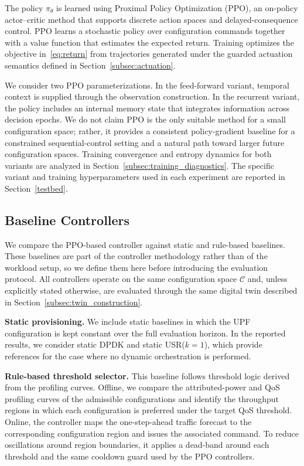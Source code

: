 \documentclass[a4paper,fleqn]{cas-sc}
\begin{document}
The policy $\pi_\theta$ is learned using Proximal Policy Optimization (PPO), an on-policy actor--critic method that supports discrete action spaces and delayed-consequence control. PPO learns a stochastic policy over configuration commands together with a value function that estimates the expected return. Training optimizes the objective in~\eqref{eq:return} from trajectories generated under the guarded actuation semantics defined in Section~\ref{subsec:actuation}.

We consider two PPO parameterizations. In the feed-forward variant, temporal context is supplied through the observation construction. In the recurrent variant, the policy includes an internal memory state that integrates information across decision epochs. We do not claim PPO is the only suitable method for a small configuration space; rather, it provides a consistent policy-gradient baseline for a constrained sequential-control setting and a natural path toward larger future configuration spaces. Training convergence and entropy dynamics for both variants are analyzed in Section~\ref{subsec:training_diagnostics}. The specific variant and training hyperparameters used in each experiment are reported in Section~\ref{testbed}.



\subsection{Baseline Controllers}
\label{subsec:baselines}

We compare the PPO-based controller against static and rule-based baselines. These baselines are part of the controller methodology rather than of the workload setup, so we define them here before introducing the evaluation protocol. All controllers operate on the same configuration space $\mathcal{C}$ and, unless explicitly stated otherwise, are evaluated through the same digital twin described in Section~\ref{subsec:twin_construction}.

\textbf{Static provisioning.} We include static baselines in which the UPF configuration is kept constant over the full evaluation horizon. In the reported results, we consider static DPDK and static USR($k=1$), which provide references for the case where no dynamic orchestration is performed.

\textbf{Rule-based threshold selector.} This baseline follows threshold logic derived from the profiling curves. Offline, we compare the attributed-power and QoS profiling curves of the admissible configurations and identify the throughput regions in which each configuration is preferred under the target QoS threshold. Online, the controller maps the one-step-ahead traffic forecast to the corresponding configuration region and issues the associated command. To reduce oscillations around region boundaries, it applies a dead-band around each threshold and the same cooldown guard used by the PPO controllers.
\end{document}
